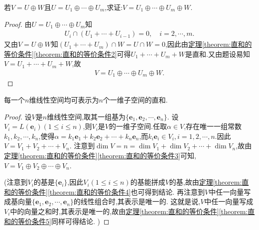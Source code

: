 \documentclass[../../main.tex]{subfiles}%
\begin{document}
\begin{proposition}\label{proposition:直和的传递性}
若\(V = U\oplus W\)且\(U = U_1\oplus \cdots \oplus U_m\),求证:\(V =U_1\oplus \cdots \oplus U_m\oplus W\). 
\end{proposition}
\begin{proof}

由\(U = U_1\oplus \cdots \oplus U_m\)知
\begin{align*}
U_i\cap (U_1+\cdots +U_{i-1}) = 0,\quad i=2,\cdots,m.
\end{align*}
又由\(V = U\oplus W\)知\((U_1+ \cdots + U_m)\cap W=U\cap W = 0\),因此由\hyperref[theorem:直和的等价条件2]{定理\ref{theorem:直和的等价条件}\ref{theorem:直和的等价条件2}}可得\(U_1+ \cdots + U_m+ W\)是直和.又由题设易知$V=U_1+ \cdots + U_m+ W$,故
\begin{align*}
V = U_1\oplus \cdots \oplus U_m\oplus W.
\end{align*}


\end{proof}

\begin{proposition}\label{proposition:n维线性空间的一维直和分解}
每一个\(n\)维线性空间均可表示为\(n\)个一维子空间的直和.
\end{proposition}
\begin{proof}

设\(V\)是\(n\)维线性空间,取其一组基为\(\{\boldsymbol{e}_1,\boldsymbol{e}_2,\cdots,\boldsymbol{e}_n\}\). 设\(V_i = L(\boldsymbol{e}_i)(1\leqslant  i\leqslant  n)\),则\(V_i\)是\(V\)的一维子空间.任取$\alpha\in V$,存在唯一一组常数$k_1,k_2,\cdots,k_n$,使得$\alpha =k_1\boldsymbol{e}_1+k_2\boldsymbol{e}_2+\cdots +k_n\boldsymbol{e}_n$,而$k_i\boldsymbol{e}_i\in V_i,i=1,2,\cdots ,n.$因此\(V = V_1 + V_2+\cdots+V_n\). 注意到\(\dim V = n=\dim V_1+\dim V_2+\cdots+\dim V_n\),故由\hyperref[theorem:直和的等价条件3]{定理\ref{theorem:直和的等价条件}\ref{theorem:直和的等价条件3}}可知,\(V = V_1\oplus V_2\oplus\cdots\oplus V_n\). 

(注意到\(V_i\)的基是\(\{\boldsymbol{e}_i\}\),因此\(V_i(1\leqslant  i\leqslant  n)\)的基能拼成\(V\)的基,故由\hyperref[theorem:直和的等价条件4]{定理\ref{theorem:直和的等价条件}\ref{theorem:直和的等价条件4}}也可得到结论. 再注意到\(V\)中任一向量写成基向量\(\{\boldsymbol{e}_1,\boldsymbol{e}_2,\cdots,\boldsymbol{e}_n\}\)的线性组合时,其表示是唯一的. 这就是说,\(V\)中任一向量写成\(V_i\)中的向量之和时,其表示是唯一的,故由\hyperref[theorem:直和的等价条件5]{定理\ref{theorem:直和的等价条件}\ref{theorem:直和的等价条件5}}同样可得结论. )

\end{proof}
\end{document}
